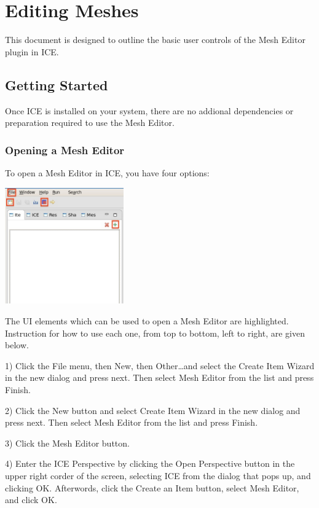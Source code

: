 \documentclass{article}
\begin{document}
\section{Editing Meshes}

This document is designed to outline the basic user controls of the Mesh Editor plugin in ICE.

\subsection{Getting Started}

Once ICE is installed on your system, there are no addional dependencies or
preparation required to use the Mesh Editor.

\subsubsection{Opening a Mesh Editor}

To open a Mesh Editor in ICE, you have four options:
 

\begin{center}
\includegraphics[height=5cm]{images/CreateNewMeshOptions.jpg}
\end{center}

The UI elements which can be used to open a Mesh Editor are
highlighted. Instruction for how to use each one, from top to bottom, left to
right, are given below.

 
1) Click the File menu, then New, then Other\ldots and select the Create Item
Wizard in the new dialog and press next. Then select Mesh Editor from the list
and press Finish.

 
2) Click the New button and select Create Item Wizard in the new dialog and
press next. Then select Mesh Editor from the list and press Finish.


3) Click the Mesh Editor button.


4) Enter the ICE Perspective by clicking the Open Perspective button in the
upper right corder of the screen, selecting ICE from the dialog that pops up,
and clicking OK. Afterwords, click the Create an Item button, select
Mesh Editor, and click OK.
\end{document}
